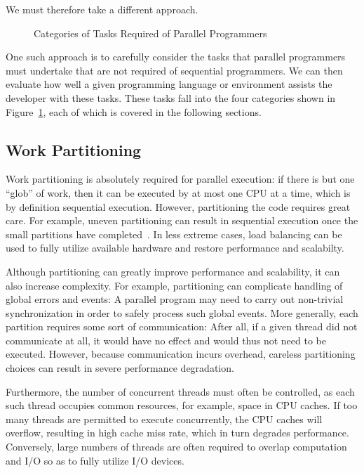 We must therefore take a different approach.

\begin{figure}[tb]
\centering
{}
\caption{Categories of Tasks Required of Parallel Programmers}
\label{fig:intro:Categories of Tasks Required of Parallel Programmers}
\end{figure}

One such approach is to carefully consider the tasks that parallel
programmers must undertake that are not required of sequential programmers.
We can then evaluate how well a given programming language or environment
assists the developer with these tasks.
These tasks fall into the four categories shown in
Figure~\ref{fig:intro:Categories of Tasks Required of Parallel Programmers},
each of which is covered in the following sections.

\subsection{Work Partitioning}
\label{sec:intro:Work Partitioning}

Work partitioning is absolutely required for parallel execution:
if there is but one ``glob'' of work, then it can be executed by at
most one CPU at a time, which is by definition sequential execution.
However, partitioning the code requires great care.
For example, uneven partitioning can result in sequential execution
once the small partitions have completed~\cite{GeneAmdahl1967AmdahlsLaw}.
In less extreme cases, load balancing can be used to fully utilize
available hardware and restore performance and scalabilty.

Although partitioning can greatly improve performance and scalability,
it can also increase complexity.
For example, partitioning can complicate handling of global
errors and events: A parallel
program may need to carry out non-trivial synchronization in order
to safely process such global events.
More generally, each partition requires some sort of communication:
After all, if
a given thread did not communicate at all, it would have no effect and
would thus not need to be executed.
However, because communication incurs overhead, careless partitioning choices
can result in severe performance degradation.

Furthermore, the number of concurrent threads must often be controlled,
as each such thread occupies common resources, for example,
space in CPU caches.
If too many threads are permitted to execute concurrently, the
CPU caches will overflow, resulting in high cache miss rate, which in
turn degrades performance.
Conversely, large numbers of threads are often required to
overlap computation and I/O so as to fully utilize I/O devices.

